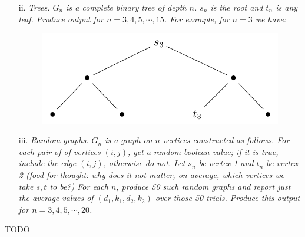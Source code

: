 \documentclass[12pt]{article} \setlength{\oddsidemargin}{0in}
\begin{document}
\begin{enumerate}
{\begin{enumerate}
\item[ii.] \textit{Trees. $G_n$ is a complete binary tree of depth $n$. $s_n$ is the root and $t_n$ is any leaf. Produce output for $n = 3, 4, 5, \cdots, 15$. For example, for $n = 3$ we have:}

  \begin{figure}[H]
  \centering \includegraphics[width=1\textwidth]{P42}
  \end{figure}

\item[iii.] \textit{Random graphs. $G_n$ is a graph on $n$ vertices constructed as follows. For each
pair of of vertices $(i, j)$, get a random boolean value; if it is true, include
the edge $(i, j)$, otherwise do not. Let $s_n$ be vertex 1 and $t_n$ be vertex 2 (food
for thought: why does it not matter, on average, which vertices we take $s, t$
to be?) For each $n$, produce 50 such random graphs and report just the
average values of $(d_1, k_ 1, d_2, k_2 )$ over those 50 trials. Produce this output for $n = 3, 4, 5, \cdots, 20$.}
    \end{enumerate}
  }

  TODO

\end{enumerate}



\end{document}
